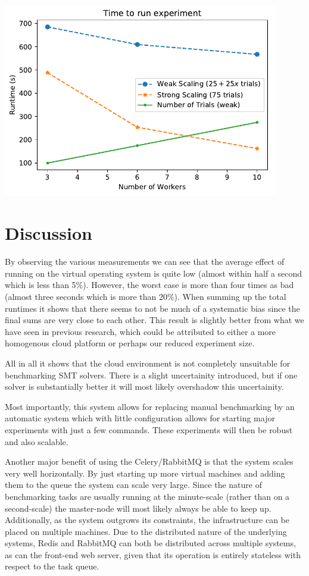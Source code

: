 \documentclass[a4paper]{IEEEtran}
\begin{document}
\begin{Figure}
  \centering \includegraphics[width=0.9\textwidth]{scaling_graph_large}
  \label{fig:scaling_large}
\end{Figure}

\section{Discussion}
By observing the various measurements we can see that the average
effect of running on the virtual operating system is quite low (almost
within half a second which is less than 5\%). However, the worst case
is more than four times as bad (almost three seconds which is more
than 20\%). When summing up the total runtimes it shows that there
seems to not be much of a systematic bias since the final sums are
very close to each other. This result is slightly better from what we
have seen in previous research, which could be attributed to either a
more homogenous cloud platform or perhaps our reduced experiment size.

All in all it shows that the cloud environment is not completely
unsuitable for benchmarking SMT solvers. There is a slight
uncertainity introduced, but if one solver is substantially better it
will most likely overshadow this uncertainity.

Most importantly, this system allows for replacing manual benchmarking
by an automatic system which with little configuration allows for
starting major experiments with just a few commands. These experiments
will then be robust and also scalable. 

Another major benefit of using the Celery/RabbitMQ is that the system
scales very well horizontally. By just starting up more virtual
machines and adding them to the queue the system can scale very
large. Since the nature of benchmarking tasks are usually running at
the minute-scale (rather than on a second-scale) the master-node will
most likely always be able to keep up. Additionally, as the system
outgrows its constraints, the infrastructure can be placed on multiple
machines. Due to the distributed nature of the underlying systems,
Redis and RabbitMQ can both be distributed across multiple systems, as
can the front-end web server, given that its operation is entirely
stateless with respect to the task queue.
\end{document}
